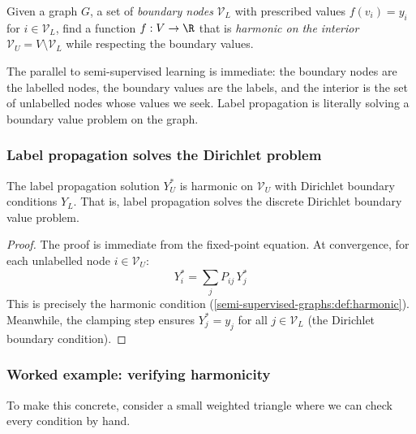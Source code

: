 \begin{notechapter}
\begin{definition}
\label{semi-supervised-graphs:def:dirichlet}
Given a graph $G$, a set of \emph{boundary nodes} $\mathcal{V}_L$ with
prescribed values $f(v_i) = y_i$ for $i \in \mathcal{V}_L$, find a function
$f : V \to \R$ that is \emph{harmonic on the interior}
$\mathcal{V}_U = V \setminus \mathcal{V}_L$ while respecting the boundary
values.
\end{definition}

The parallel to semi-supervised learning is immediate: the boundary
nodes are the labelled nodes, the boundary values are the labels, and the
interior is the set of unlabelled nodes whose values we seek. Label
propagation is literally solving a boundary value problem on the graph.

\subsubsection*{Label propagation solves the Dirichlet problem}

\begin{proposition}
\label{semi-supervised-graphs:prop:harmonic}
The label propagation solution $Y_U^*$ is harmonic on $\mathcal{V}_U$ with
Dirichlet boundary conditions $Y_L$. That is, label propagation solves the
discrete Dirichlet boundary value problem.
\end{proposition}

\begin{proof}
The proof is immediate from the fixed-point equation. At convergence, for
each unlabelled node $i \in \mathcal{V}_U$:
\[
Y_i^* = \sum_j P_{ij}\,Y_j^*
\]
This is precisely the harmonic condition
(\cref{semi-supervised-graphs:def:harmonic}). Meanwhile, the clamping step ensures
$Y_j^* = y_j$ for all $j \in \mathcal{V}_L$ (the Dirichlet boundary
condition).
\end{proof}

\subsubsection*{Worked example: verifying harmonicity}

To make this concrete, consider a small weighted triangle where we can check
every condition by hand.

\begin{figure}[ht]
\centering
{}
\end{figure}
\end{notechapter}
